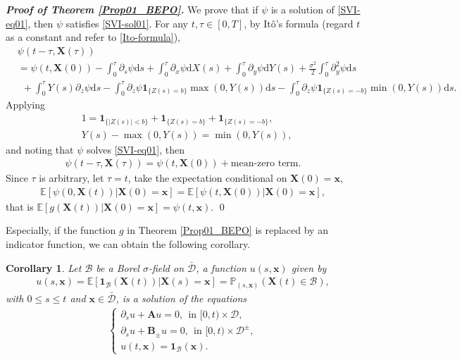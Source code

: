 \documentclass[12pt]{article}
\numberwithin{equation}{section}
\newtheorem{corollary}[theorem]{Corollary}
\def \E{\mathbb E}
\def \AA {\mathbf A}
\def \BB {\mathbf B}
\newcommand{\D}{\mathcal{D}}
\def\d{\mathrm{d}}
\newcommand{\indic}{\mathbf{1}}
\begin{document}
{\noindent \it \bf Proof of Theorem \ref{Prop01_BEPO}.}  
We prove that if $\psi$ is a solution of \eqref{SVI-eq01}, 
then $\psi$ satisfies \eqref{SVI-sol01}. 
For any $t,\tau \in [0,T]$,  
by It\^{o}'s formula (regard $t$ as a constant and refer to \eqref{Ito-formula}), 
\begin{align*}
	&\psi(t - \tau, \mathbf{X}(\tau)) \\
	&= \psi(t, \mathbf{X}(0))  
	- \int_{0}^{\tau} \partial_{s}\psi \d s 
	+  \int_0^\tau \partial_x \psi \d X(s)
	+ \int_0^\tau\partial_y \psi \d Y(s)
	+ \frac{\sigma^2}{2}\int_0^\tau\partial^{2}_{y} \psi \d s\\
	& ~~+ \int_0^\tau Y(s) \partial_z \psi \mathrm{d} s 
	- \int_0^\tau \partial_z \psi 
	\indic_{\{Z(s) = b\}} \max(0, Y(s)) \d s 
	-  \int_0^\tau \partial_z \psi \indic_{\{Z(s) = -b\}} \min(0, Y(s)) \d s. 
\end{align*}
Applying 
\begin{align*}
	&1 = \indic_{\{|Z(s)| < b\}} + \indic_{\{Z(s) = b\}}  + \indic_{\{Z(s) = -b\}},\\
	&Y(s) - \max(0, Y(s)) =  \min(0, Y(s)),
\end{align*}
and noting that $\psi$ solves  \eqref{SVI-eq01}, then
\begin{align*}
	\psi(t - \tau, \mathbf{X}(\tau)) = \psi(t, \mathbf{X}(0))  
	+ \text{mean-zero~term}.
\end{align*}
Since $\tau$ is arbitrary, let $\tau = t$, 
take the expectation conditional on $\mathbf{X}(0) = \mathbf{x}$, 
\begin{align*}
	\E[\psi(0 , \mathbf{X}(t)) |  \mathbf{X}(0) = \mathbf{x}]
	=\E[\psi(t, \mathbf{X}(0)) | \mathbf{X}(0) = \mathbf{x} ],
\end{align*}
that is 
$\E[g(\mathbf{X}(t)) | \mathbf{X}(0) = \mathbf{x}] = \psi(t, \mathbf{x})$. 	\qed


Especially, if the function $g$ in Theorem \ref{Prop01_BEPO} is replaced by an indicator function, 
we can obtain the following corollary. 
\begin{corollary}
	Let $\mathcal{B}$ be a Borel $\sigma$-field on $\bar{\mathcal{D}}$, 
	a function $u(s, \mathbf{x})$ given by
	\begin{align*}
		u(s, \mathbf{x}) 
		= \E[\indic_{\mathcal{B}}(\mathbf{X}(t)) | \mathbf{X}(s) = \mathbf{x} ] 
		= \mathbb{P}_{(s,\mathbf{x})}(\mathbf{X}(t)\in \mathcal{B}),
	\end{align*}
	with $0\leq s\leq t$ and $\mathbf{x}\in \bar{\D}$, is a solution of the equations
	\begin{align*}
		\begin{cases}
			\partial_{s} u  + \AA u = 0,~~\text{in~} [0,t)\times \D,\\
			\partial_{s} u + \BB_{\pm} u = 0,~~\text{in~}[0,t)\times \D^{\pm},\\
			u(t,\mathbf{x}) = \indic_{\mathcal{B}}(\mathbf{x}). 
		\end{cases}
	\end{align*}
\end{corollary}
\end{document}
